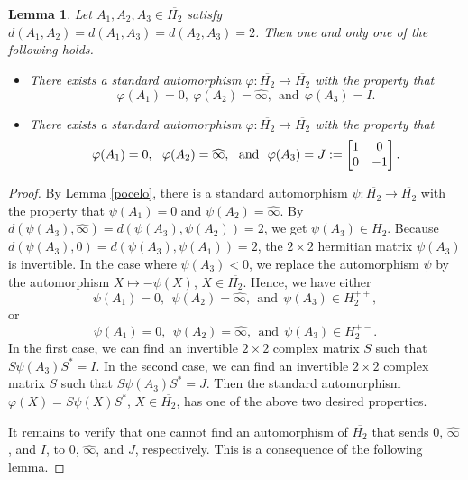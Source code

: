 \documentclass[10pt,a4paper]{amsart}
\providecommand{\index}[1]{}
\newcommand\oH{{\overline{H_2}}}
\newcommand\oi{{\widehat{\infty}}}
\newtheorem{lemma}[theorem]{Lemma}
\theoremstyle{definition}
\theoremstyle{remark}
\numberwithin{subsection}{section}
\numberwithin{equation}{section}
\begin{document}
\begin{lemma}\label{threepoints}
Let $A_1 , A_2 , A_3 \in \oH$ satisfy $d(A_1 , A_2 ) = d(A_1 , A_3 ) = d(A_2 , A_3 ) = 2$. Then one and only one of the following holds.
\begin{itemize}
\item There exists a standard automorphism $\varphi \colon \oH \to \oH$ with the property that 
\[
\varphi (A_1) = 0,\ \varphi (A_2) = \oi,\ \  \text{and}\ \  \varphi (A_3) = I.
\]
\item There exists a standard automorphism $\varphi \colon \oH \to \oH$ with the property that 
\[
\varphi (A_1) = 0,\ \ \varphi (A_2) = \oi,\ \ \text{and}\ \ \varphi (A_3) = J := \left[ \begin{matrix} 1 & 0 \cr 0 & -1 \cr \end{matrix} \right]. \index{$J$}
\]
\end{itemize}
\end{lemma}

\begin{proof}
By Lemma \ref{pocelo}, there is a standard automorphism $\psi \colon \oH \to \oH$ with the property that $\psi (A_1) = 0$ and $\psi (A_2) = \oi$. 
By $d(\psi (A_3) , \oi) = d(\psi (A_3) , \psi (A_2)) = 2$, we get $\psi (A_3)\in H_2$.
Because $d(\psi (A_3) , 0) = d(\psi (A_3) , \psi (A_1)) = 2$, the $2 \times 2$ hermitian matrix $\psi (A_3)$ is invertible.
In the case where $\psi (A_3)<0$, we replace the automorphism $\psi$ by the automorphism $X \mapsto -\psi (X)$, $X \in \oH$. Hence, we have either 
\[
\psi (A_1) = 0,\ \ \psi (A_2) = \oi,\ \ \text{and}\ \ \psi (A_3)\in H_2^{++},
\]
 or 
\[
\psi (A_1) = 0,\ \ \psi (A_2) = \oi, \ \ \text{and} \ \ \psi (A_3)\in H_2^{+-}.
\] 
In the first case, we can find an invertible $2 \times 2$ complex matrix $S$ such that $S \psi (A_3) S^\ast = I$.
In the second case, we can find an invertible $2 \times 2$ complex matrix $S$ such that $S \psi (A_3) S^\ast = J$. Then the standard automorphism $\varphi (X)= S\psi (X) S^\ast$, $X \in \oH$, has one of the above two desired properties. 

It remains to verify that one cannot find an automorphism of $\oH$ that sends $0$, ${\oi}$, and $I$, to $0$, ${\oi}$, and $J$, respectively. 
This is a consequence of the following lemma.
\end{proof}
\end{document}
